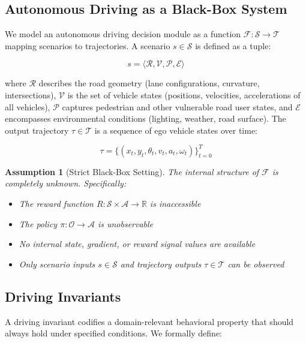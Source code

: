 \documentclass[conference]{IEEEtran}
\theoremstyle{plain}
\newtheorem{assumption}{Assumption}[section]
\newcommand{\scenario}{\mathcal{S}}
\newcommand{\traj}{\mathcal{T}}
\newcommand{\sys}{\mathcal{F}}
\begin{document}
\subsection{Autonomous Driving as a Black-Box System}

We model an autonomous driving decision module as a function $\sys: \scenario \rightarrow \traj$ mapping scenarios to trajectories. A scenario $s \in \scenario$ is defined as a tuple:

\begin{equation}
s = \langle \mathcal{R}, \mathcal{V}, \mathcal{P}, \mathcal{E} \rangle
\label{eq:scenario}
\end{equation}

where $\mathcal{R}$ describes the road geometry (lane configurations, curvature, intersections), $\mathcal{V}$ is the set of vehicle states (positions, velocities, accelerations of all vehicles), $\mathcal{P}$ captures pedestrian and other vulnerable road user states, and $\mathcal{E}$ encompasses environmental conditions (lighting, weather, road surface). The output trajectory $\tau \in \traj$ is a sequence of ego vehicle states over time:

\begin{equation}
\tau = \{(x_t, y_t, \theta_t, v_t, a_t, \omega_t)\}_{t=0}^T
\label{eq:trajectory}
\end{equation}

\begin{assumption}[Strict Black-Box Setting]\label{assump:blackbox}
The internal structure of $\sys$ is completely unknown. Specifically:
\begin{itemize}[nosep]
    \item The reward function $R: \scenario \times \mathcal{A} \rightarrow \mathbb{R}$ is inaccessible
    \item The policy $\pi: \mathcal{O} \rightarrow \mathcal{A}$ is unobservable
    \item No internal state, gradient, or reward signal values are available
    \item Only scenario inputs $s \in \scenario$ and trajectory outputs $\tau \in \traj$ can be observed
\end{itemize}
\end{assumption}

\subsection{Driving Invariants}

A driving invariant codifies a domain-relevant behavioral property that should always hold under specified conditions. We formally define:
\end{document}

